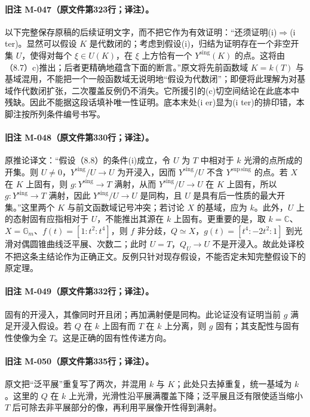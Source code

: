 \paragraph{旧注 M-047（原文件第323行；译注）。}
以下完整保存原稿的后续证明文字，而不把它作为有效证明：“还须证明(i)$\Rightarrow$(i ter)。显然可以假设 $K$ 是代数闭的；考虑到假设(i)，归结为证明存在一个非空开集 $U$，使得对每个 $\xi\in U(K)$，在 $\xi$ 上方恰有一个 ${Y^{\mathrm{sing}}}(K)$ 的点。这将由（8.7）c)推出；后者更精确地蕴含下面的断言。”原文将先前函数域 $K=k(T)$ 与基域混用，不能把一个一般函数域无说明地“假设为代数闭”；即便将此理解为对基域作代数闭扩张，二次覆盖反例仍不消失。它所援引的(c)切空间结论在此底本中残缺。因此不能据这段话填补唯一性证明。底本末处(i er)显为(i ter)的排印错，本脚注按所列条件编号书写。

\paragraph{旧注 M-048（原文件第330行；译注）。}
原推论译文：“假设（8.8）的条件(i)成立，令 $U$ 为 $T$ 中相对于 $k$ 光滑的点所成的开集。则 $U\ne0$，${Y^{\mathrm{sing}}}/U\to U$ 为开浸入，因而 ${Y^{\mathrm{sing}}}/U$ 不含 ${Y^{\mathrm{sup\,sing}}}$ 的点。若 $X$ 在 $K$ 上固有，则 $g:{Y^{\mathrm{sing}}}\to T$ 满射，从而 ${Y^{\mathrm{sing}}}/U\to U$ 在 $K$ 上固有，所以 $g:{Y^{\mathrm{sing}}}\to T$ 满射，因此 ${Y^{\mathrm{sing}}}/U\to U$ 是同构，且 $U$ 是具有后一性质的最大开集。”这里两个 $K$ 与前文函数域记号冲突；若讨论 $X$ 的基域，应为 $k$。此外，$U$ 上的态射固有应指相对于 $U$，不能推出其源在 $k$ 上固有。更重要的是，取 $k=\mathbb C$、$X=\mathbb G_m$、$f(t)=[1:t^2:t^4]$，则 $f$ 非分歧，$Q\simeq X$，$g(t)=[t^4:-2t^2:1]$ 到光滑对偶圆锥曲线泛平展、次数二；此时 $U=T$，$Q_U\to U$ 不是开浸入。故此处译校不把这条主结论作为正确正文。反例只针对现存假设，不能否定未知完整假设下的原定理。

\paragraph{旧注 M-049（原文件第332行；译注）。}
固有的开浸入，其像同时开且闭；再加满射便是同构。此论证没有证明当前 $g$ 满足开浸入假设。若 $Q$ 在 $k$ 上固有而 $T$ 在 $k$ 上分离，则 $g$ 固有；其支配性与固有性使像为全 $T$。这是正确的固有性传递方向。

\paragraph{旧注 M-050（原文件第335行；译注）。}
原文把“泛平展”重复写了两次，并混用 $k$ 与 $K$；此处只去掉重复，统一基域为 $k$。这里的 $Q$ 在 $k$ 上光滑，光滑性沿平展满覆盖下降；泛平展且泛有限使适当缩小 $T$ 后可除去非平展部分的像，再利用平展像开性得到满射。

